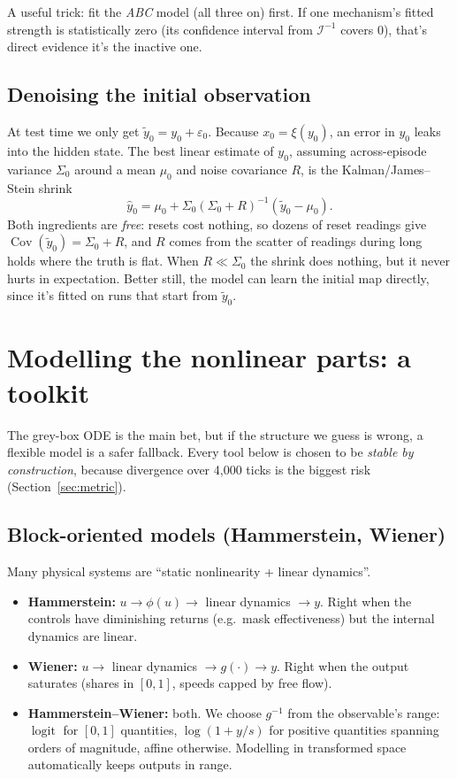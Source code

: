 \documentclass[11pt]{article}
\theoremstyle{plain}
\theoremstyle{definition}
\theoremstyle{remark}
\begin{document}
A useful trick: fit the \emph{ABC} model (all three on) first. If one mechanism's fitted strength is statistically zero (its confidence interval from $\mathcal I^{-1}$ covers 0), that's direct evidence it's the inactive one.

\subsection{Denoising the initial observation}
At test time we only get $\tilde y_0=y_0+\varepsilon_0$. Because $x_0=\xi(y_0)$, an error in $y_0$ leaks into the hidden state. The best linear estimate of $y_0$, assuming across-episode variance $\Sigma_0$ around a mean $\mu_0$ and noise covariance $R$, is the Kalman/James--Stein shrink
\begin{equation}\label{eq:shrink0}
\hat y_0=\mu_0+\Sigma_0(\Sigma_0+R)^{-1}(\tilde y_0-\mu_0).
\end{equation}
Both ingredients are \emph{free}: resets cost nothing, so dozens of reset readings give $\operatorname{Cov}(\tilde y_0)=\Sigma_0+R$, and $R$ comes from the scatter of readings during long holds where the truth is flat. When $R\ll\Sigma_0$ the shrink does nothing, but it never hurts in expectation. Better still, the model can learn the initial map directly, since it's fitted on runs that start from $\tilde y_0$.

\section{Modelling the nonlinear parts: a toolkit}\label{sec:nonlinear}

The grey-box ODE is the main bet, but if the structure we guess is wrong, a flexible model is a safer fallback. Every tool below is chosen to be \emph{stable by construction}, because divergence over 4,000 ticks is the biggest risk (Section~\ref{sec:metric}).

\subsection{Block-oriented models (Hammerstein, Wiener)}
Many physical systems are ``static nonlinearity + linear dynamics''.
\begin{itemize}
\item \textbf{Hammerstein:} $u\to\phi(u)\to$ linear dynamics $\to y$. Right when the controls have diminishing returns (e.g.\ mask effectiveness) but the internal dynamics are linear.
\item \textbf{Wiener:} $u\to$ linear dynamics $\to g(\cdot)\to y$. Right when the output saturates (shares in $[0,1]$, speeds capped by free flow).
\item \textbf{Hammerstein--Wiener:} both. We choose $g^{-1}$ from the observable's range: $\operatorname{logit}$ for $[0,1]$ quantities, $\log(1+y/s)$ for positive quantities spanning orders of magnitude, affine otherwise. Modelling in transformed space automatically keeps outputs in range.
\end{itemize}
\end{document}
